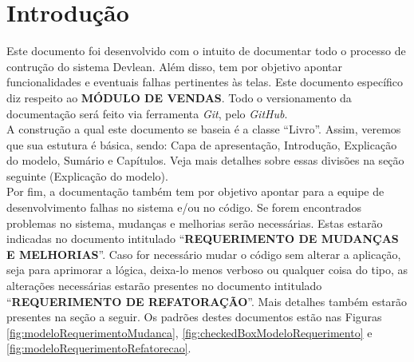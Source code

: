 \section*{Introdução}

Este documento foi desenvolvido com o intuito de documentar todo o processo de contrução do sistema
Devlean. Além disso, tem por objetivo apontar funcionalidades e eventuais falhas pertinentes às
telas. Este documento específico diz respeito ao \textbf{MÓDULO DE VENDAS}. Todo o versionamento
da documentação será feito via ferramenta \textit{Git}, pelo \textit{GitHub}.\\

A construção a qual este documento se baseia é a classe ``Livro''. Assim, veremos que sua 
estutura é básica, sendo: Capa de apresentação, Introdução, Explicação do modelo, Sumário e Capítulos. 
Veja mais detalhes sobre essas divisões na seção seguinte (Explicação do modelo).\\

Por fim, a documentação também tem por objetivo apontar para a equipe de desenvolvimento falhas no sistema 
e/ou no código. Se forem encontrados problemas no sistema, mudanças e melhorias serão necessárias. Estas
estarão indicadas no documento intitulado ``\textbf{REQUERIMENTO DE MUDANÇAS E MELHORIAS}''. Caso for necessário
mudar o código sem alterar a aplicação, seja para aprimorar a lógica, deixa-lo menos verboso ou qualquer
coisa do tipo, as alterações necessárias estarão presentes no documento intitulado ``\textbf{REQUERIMENTO
DE REFATORAÇÃO}''. Mais detalhes também estarão presentes na seção a seguir. Os padrões destes documentos
estão nas Figuras \ref{fig:modeloRequerimentoMudanca}, \ref{fig:checkedBoxModeloRequerimento} e
\ref{fig:modeloRequerimentoRefatorecao}.






